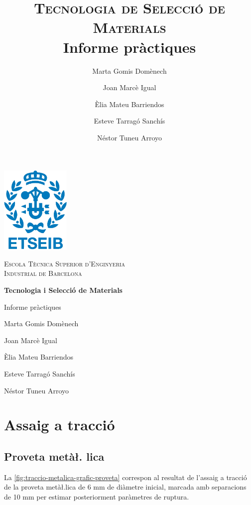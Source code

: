 \documentclass[a4paper]{report}
\title{\textsc{\huge Tecnologia de Selecció de Materials} \\
        Informe pràctiques}
\author{Marta Gomis Domènech \and 
    Joan Marcè Igual \and 
    Èlia Mateu Barriendos \and 
    Esteve Tarragó Sanchís \and 
    Néstor Tuneu Arroyo}
\begin{document}
\begin{titlepage}
    \centering
    \vspace{1cm}
    \includegraphics[width=0.25\textwidth]{images/etseib}
    \par\vspace{1cm}
    \textsc{ \LARGE Escola Tècnica Superior d'Enginyeria \\[1em] 
        Industrial de Barcelona}
    \par\vspace{2cm}
    \textbf{\Huge Tecnologia i Selecció de Materials}
    \par\vspace{2cm}
    {\LARGE Informe pràctiques}
    \vfill
    \begin{flushright}
        \large
        Marta Gomis Domènech \par
        Joan Marcè Igual \par
        Èlia Mateu Barriendos \par
        Esteve Tarragó Sanchís \par
        Néstor Tuneu Arroyo
    \end{flushright}
\end{titlepage}

\tableofcontents

\chapter{Assaig a tracció}

\section{Proveta metà\l. lica }

La \autoref{fig:traccio-metalica-grafic-proveta} correspon al resultat de l'assaig a tracció de la proveta metà\l.lica de 6 mm de diàmetre inicial, marcada amb separacions de 10 mm per estimar posteriorment paràmetres de ruptura. 
\end{document}
